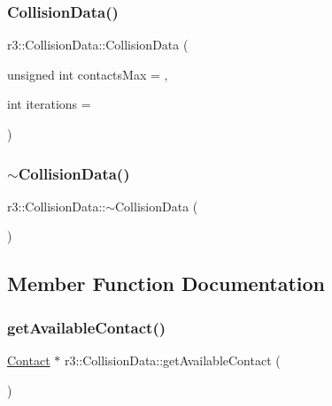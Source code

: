 \subsubsection{\texorpdfstring{Collision\+Data()}{CollisionData()}}
{\footnotesize\ttfamily r3\+::\+Collision\+Data\+::\+Collision\+Data (\begin{DoxyParamCaption}\item[{unsigned int}]{contacts\+Max = {},  }\item[{int}]{iterations = {} }\end{DoxyParamCaption})\hspace{0.3cm}{\ttfamily [explicit]}}

\mbox{\label{classr3_1_1_collision_data_a3fd93aed7add6b43bc6b3dca59d638f2}} 
\subsubsection{\texorpdfstring{$\sim$\+Collision\+Data()}{~CollisionData()}}
{\footnotesize\ttfamily r3\+::\+Collision\+Data\+::$\sim$\+Collision\+Data (\begin{DoxyParamCaption}{ }\end{DoxyParamCaption})\hspace{0.3cm}{\ttfamily [default]}}



\subsection{Member Function Documentation}
\mbox{\label{classr3_1_1_collision_data_ad0e0b85004905b48a8faf7be34bdf305}} 
\subsubsection{\texorpdfstring{get\+Available\+Contact()}{getAvailableContact()}}
{\footnotesize\ttfamily \mbox{\hyperlink{classr3_1_1_contact}{Contact}} $\ast$ r3\+::\+Collision\+Data\+::get\+Available\+Contact (\begin{DoxyParamCaption}{ }\end{DoxyParamCaption})}

